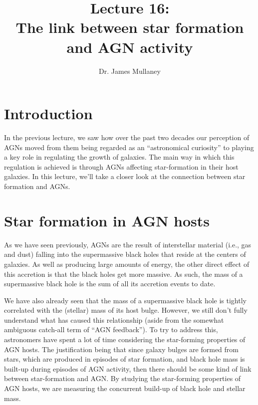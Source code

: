 \documentclass[11pt]{article}
\begin{document}
 
\title{Lecture 16:\\The link between star formation and AGN activity}
\author{Dr. James Mullaney}
\maketitle

\section{Introduction}
In the previous lecture, we saw how over the past two decades our
perception of AGNs moved from them being regarded as an ``astronomical
curiosity'' to playing a key role in regulating the growth of
galaxies. The main way in which this regulation is achieved is through
AGNs affecting star-formation in their host galaxies. In this lecture,
we'll take a closer look at the connection between star formation and AGNs.

\section{Star formation in AGN hosts}
As we have seen previously, AGNs are the result of interstellar
material (i.e., gas and dust) falling into the supermassive black
holes that reside at the centers of galaxies. As well as producing
large amounts of energy, the other direct effect of this accretion is
that the black holes get more massive. As such, the mass of a
supermassive black hole is the sum of all its accretion events to date.

We have also already seen that the mass of a supermassive black hole
is tightly correlated with the (stellar) mass of its host
bulge. However, we still don't fully understand what has caused this
relationship (aside from the somewhat ambiguous catch-all term of
``AGN feedback''). To try to address this, astronomers have spent a
lot of time considering the star-forming properties of AGN hosts. The
justification being that since galaxy bulges are formed from stars,
which are produced in episodes of star formation, and black hole mass
is built-up during episodes of AGN activity, then there should be some
kind of link between star-formation and AGN. By studying the
star-forming properties of AGN hosts, we are measuring the concurrent
build-up of black hole and stellar mass.
\end{document}
